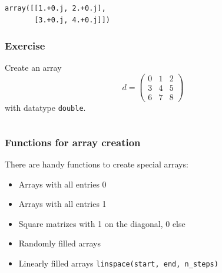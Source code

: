 \documentclass[11pt,a4paper, d]{scrartcl}
\makeatletter
\providecommand{\tightlist}{%
      \setlength{\itemsep}{0pt}\setlength{\parskip}{0pt}}
\newcommand{\boxspacing}{\kern\kvtcb@left@rule\kern\kvtcb@boxsep}
\newcommand{\prompt}[4]{
        \ttfamily\llap{{\color{#2}[#3]:\hspace{3pt}#4}}\vspace{-\baselineskip}
    }
\makeatother
\begin{document}
            \begin{tcolorbox}[breakable, size=fbox, boxrule=.5pt, pad at break*=1mm, opacityfill=0]
\prompt{Out}{outcolor}{3}{\boxspacing}
\begin{Verbatim}[commandchars=\\\{\}]
array([[1.+0.j, 2.+0.j],
       [3.+0.j, 4.+0.j]])
\end{Verbatim}
\end{tcolorbox}
        
    \hypertarget{exercise}{%
\subsubsection{Exercise}\label{exercise}}

Create an array \[d = \begin{pmatrix} 
0& 1& 2 \\ 
3 & 4 & 5 \\
6 & 7 & 8 \end{pmatrix}\] with datatype \texttt{double}.

    \begin{tcolorbox}[breakable, size=fbox, boxrule=1pt, pad at break*=1mm,colback=cellbackground, colframe=cellborder]
\prompt{In}{incolor}{ }{\boxspacing}
\begin{Verbatim}[commandchars=\\\{\}]

\end{Verbatim}
\end{tcolorbox}

    \hypertarget{functions-for-array-creation}{%
\subsubsection{Functions for array
creation}\label{functions-for-array-creation}}

There are handy functions to create special arrays:

\begin{itemize}
\tightlist
\item
  Arrays with all entries 0
\item
  Arrays with all entries 1
\item
  Square matrizes with 1 on the diagonal, 0 else
\item
  Randomly filled arrays
\item
  Linearly filled arrays \texttt{linspace(start,\ end,\ n\_steps)}
\end{itemize}
\end{document}
